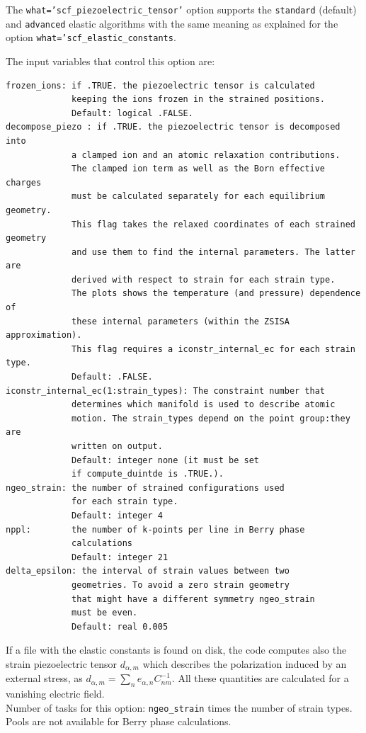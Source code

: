 \documentclass[12pt,a4paper,twoside]{report}
\begin{document}
The \texttt{what='scf\_piezoelectric\_tensor'} option supports the
\texttt{standard} (default) and 
\texttt{advanced} elastic algorithms with the same meaning as explained
for the option \texttt{what='scf\_elastic\_constants}.

The input variables that control this option are:
\begin{verbatim}
frozen_ions: if .TRUE. the piezoelectric tensor is calculated 
             keeping the ions frozen in the strained positions. 
             Default: logical .FALSE.
decompose_piezo : if .TRUE. the piezoelectric tensor is decomposed into
             a clamped ion and an atomic relaxation contributions.
             The clamped ion term as well as the Born effective charges 
             must be calculated separately for each equilibrium geometry.
             This flag takes the relaxed coordinates of each strained geometry
             and use them to find the internal parameters. The latter are
             derived with respect to strain for each strain type.
             The plots shows the temperature (and pressure) dependence of 
             these internal parameters (within the ZSISA approximation). 
             This flag requires a iconstr_internal_ec for each strain type.
             Default: .FALSE.
iconstr_internal_ec(1:strain_types): The constraint number that
             determines which manifold is used to describe atomic
             motion. The strain_types depend on the point group:they are
             written on output.
             Default: integer none (it must be set
             if compute_duintde is .TRUE.).
ngeo_strain: the number of strained configurations used 
             for each strain type. 
             Default: integer 4
nppl:        the number of k-points per line in Berry phase 
             calculations
             Default: integer 21
delta_epsilon: the interval of strain values between two 
             geometries. To avoid a zero strain geometry 
             that might have a different symmetry ngeo_strain 
             must be even.
             Default: real 0.005
\end{verbatim}
If a file with the elastic constants is found on disk, the code computes also
the strain piezoelectric tensor $d_{\alpha,m}$ which describes
the polarization induced by an external stress, as $d_{\alpha,m}=
\sum_n e_{\alpha,n} C_{nm}^{-1}$. All these quantities are calculated 
for a vanishing electric field. \\
Number of tasks for this option: \texttt{ngeo\_strain} times the number of
strain types. \\
Pools are not available for Berry phase calculations.
\newpage
\end{document}
